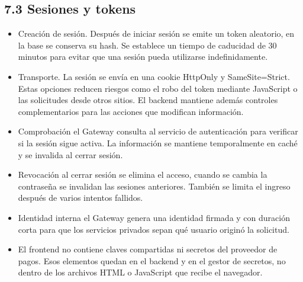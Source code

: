 \documentclass[10pt,letterpaper]{article}
\begin{document}
\subsection*{7.3 Sesiones y tokens}
\begin{itemize}
\item Creación de sesión. Después de iniciar sesión se emite un token aleatorio, en la base se conserva su hash. Se establece un tiempo de caducidad de 30 minutos para evitar que una sesión pueda utilizarse indefinidamente.
\item Transporte. La sesión se envía en una cookie HttpOnly y SameSite=Strict. Estas opciones reducen riesgos como el robo del token mediante JavaScript o las solicitudes desde otros sitios. El backend mantiene además controles complementarios para las acciones que modifican información.
\item Comprobación el Gateway consulta al servicio de autenticación para verificar si la sesión sigue activa. La información se mantiene temporalmente en caché y se invalida al cerrar sesión.
\item Revocación al cerrar sesión se elimina el acceso, cuando se cambia la contraseña se invalidan las sesiones anteriores. También se limita el ingreso después de varios intentos fallidos.
\item Identidad interna el Gateway genera una identidad firmada y con duración corta para que los servicios privados sepan qué usuario originó la solicitud.
\item El frontend no contiene claves compartidas ni secretos del proveedor de pagos. Esos elementos quedan en el backend y en el gestor de secretos, no dentro de los archivos HTML o JavaScript que recibe el navegador.
\end{itemize}
\end{document}
